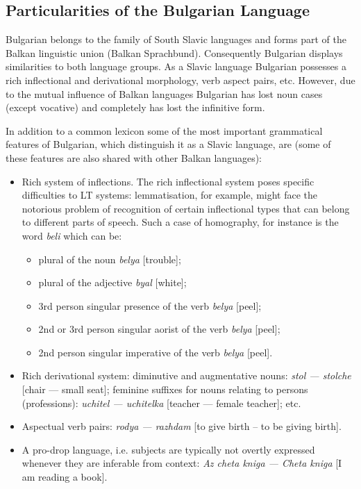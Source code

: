 \documentclass[]{../../metanetpaper}
\begin{document}
\begin{multicols}{2}
\subsection{Particularities of the Bulgarian Language}

Bulgarian belongs to the family of South Slavic languages and forms part of the Balkan linguistic union (Balkan Sprachbund). Consequently Bulgarian displays similarities to both language groups. As a Slavic language Bulgarian possesses a rich inflectional and derivational morphology, verb aspect pairs, etc. However, due to the mutual influence of Balkan languages Bulgarian has lost noun cases (except vocative) and completely has lost the infinitive form.

In addition to a common lexicon some of the most important grammatical features of Bulgarian, which distinguish it as a Slavic language, are (some of these features are also shared with other Balkan languages):
\begin{itemize}
\item Rich system of inflections. The rich inflectional system poses specific difficulties to LT systems: lemmatisation, for example, might face the notorious problem of recognition of certain inflectional types that can belong to different parts of speech. Such a case of homography, for instance is the word \textit{{beli}} which can be: 
\begin{itemize}
\item plural of the noun \textit{{belya}} [trouble];
\item plural of the adjective \textit{{byal}} [white];
\item 3rd person singular presence of the verb \textit{{belya}} [peel];
\item 2nd or 3rd person singular aorist of the verb \textit{{belya}} [peel];
\item 2nd person singular imperative of the verb \textit{{belya}} [peel]. 
\end{itemize}

\item Rich derivational system: diminutive and augmentative nouns: \textit{{stol — stolche}} [chair — small seat]; feminine suffixes for nouns relating to persons (professions): \textit{{uchitel — uchitelka}} [teacher — female teacher]; etc.

\item Aspectual verb pairs: \textit{{rodya — razhdam}} [to give birth – to be giving birth].

\item A pro-drop language, i.e. subjects are typically not overtly expressed whenever they are inferable from context: \textit{{Az cheta kniga — Cheta kniga}} [I am reading a book]. 
\end{itemize}


\end{multicols}
\end{document}
